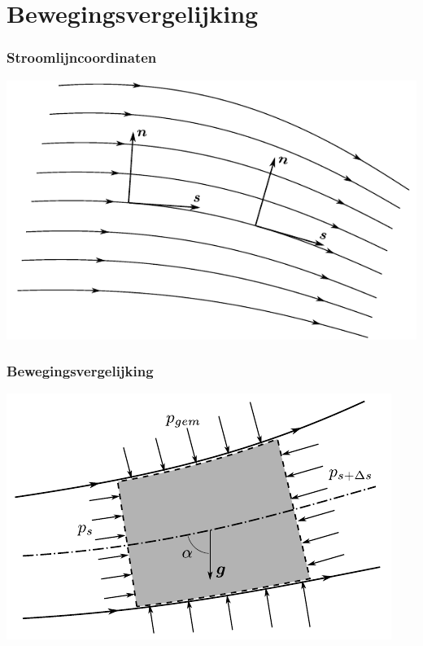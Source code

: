 \documentclass[t]{beamer}
\begin{document}
  	\section{Bewegingsvergelijking}	
  	\begin{frame}
		\frametitle{Stroomlijncoordinaten}
		\vspace{0.5cm}
		\centering
		\includegraphics{fig/deeltjesvergelijkingen/Stoomlijncoordinaten}
  	\end{frame}
  	\begin{frame}
		\frametitle{Bewegingsvergelijking}
		\vspace{0.5cm}
		\centering
		\includegraphics{fig/deeltjesvergelijkingen/Controlevolume_tussen_stroomlijnen}
  	\end{frame}
\end{document}
